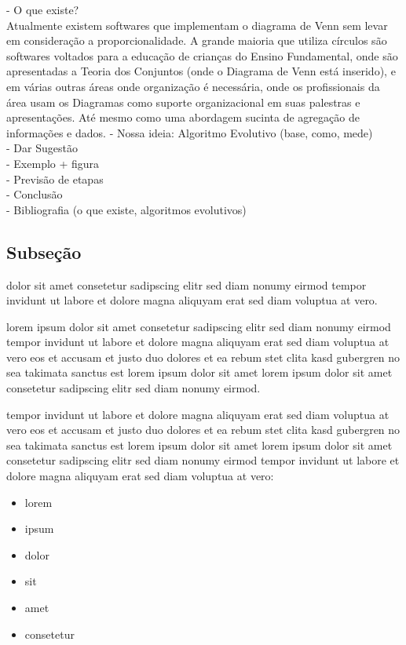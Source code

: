   
- O que existe?\\
Atualmente existem softwares que implementam o diagrama de Venn sem levar em consideração a proporcionalidade. A grande maioria que utiliza círculos são softwares voltados para a educação de crianças do Ensino Fundamental, onde são apresentadas a Teoria dos Conjuntos (onde o Diagrama de Venn está inserido), e em várias outras áreas onde organização é necessária, onde os profissionais da área usam os Diagramas como suporte organizacional em suas palestras e apresentações. Até mesmo como uma abordagem sucinta de agregação de informações e dados. 
- Nossa ideia: Algoritmo Evolutivo (base, como, mede)\\
 - Dar Sugestão\\
 - Exemplo + figura\\
 
- Previsão de etapas\\
- Conclusão\\
- Bibliografia (o que existe, algoritmos evolutivos)  \\

\subsection{Subseção}

dolor sit amet consetetur sadipscing elitr sed diam nonumy eirmod
tempor invidunt ut labore et dolore magna aliquyam erat sed diam
voluptua at vero.

lorem ipsum dolor sit amet consetetur sadipscing elitr sed diam
nonumy eirmod tempor invidunt ut labore et dolore magna aliquyam
erat sed diam voluptua at vero eos et accusam et justo duo dolores
et ea rebum stet clita kasd gubergren no sea takimata sanctus est
lorem ipsum dolor sit amet lorem ipsum dolor sit amet consetetur
sadipscing elitr sed diam nonumy eirmod.

tempor invidunt ut labore et dolore magna aliquyam erat sed diam voluptua at
vero eos et accusam et justo duo dolores et ea rebum stet clita kasd
gubergren no sea takimata sanctus est lorem ipsum dolor sit amet lorem ipsum
dolor sit amet consetetur sadipscing elitr sed diam nonumy eirmod tempor
invidunt ut labore et dolore magna aliquyam erat sed diam voluptua
at vero:

\begin{itemize}
   \item lorem
   \item ipsum
   \item dolor
   \item sit
   \item amet
   \item consetetur
\end{itemize}

